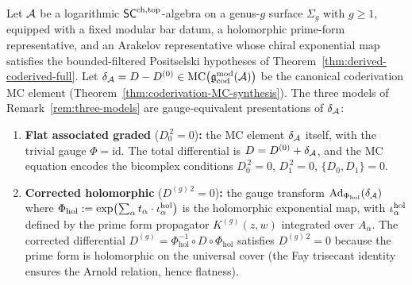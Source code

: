 \begin{theorem}
\label{thm:three-models-gauge-orbit}
Let $\mathcal{A}$ be a logarithmic $\mathsf{SC}^{\mathrm{ch,top}}$-algebra on a genus-$g$ surface
$\Sigma_g$ with $g \ge 1$, equipped with a fixed modular bar datum, a
holomorphic prime-form representative, and an Arakelov representative
whose chiral exponential map satisfies the bounded-filtered Positselski
hypotheses of Theorem~\ref{thm:derived-coderived-full}. Let
$\delta_{\mathcal{A}} = D - D^{(0)} \in
\operatorname{MC}\bigl(\mathfrak{g}^{\mathrm{mod}}_{\mathrm{cod}}(\mathcal{A})\bigr)$
be the canonical coderivation MC element
\textup{(}Theorem~\textup{\ref{thm:coderivation-MC-synthesis})}.
The three models of
Remark~\textup{\ref{rem:three-models}} are gauge-equivalent
presentations of $\delta_{\mathcal{A}}$:
\begin{enumerate}[label=\textup{(\roman*)}]
\item \textbf{Flat associated graded}
 \textup{(}$D_0^{\,2} = 0$\textup{)}\textbf{:}
 the MC element $\delta_{\mathcal{A}}$ itself, with the trivial gauge
 $\Phi = \mathrm{id}$. The total differential is
 $D = D^{(0)} + \delta_{\mathcal{A}}$, and the MC equation encodes
 the bicomplex conditions $D_0^{\,2} = 0$, $D_1^{\,2} = 0$,
 $\{D_0, D_1\} = 0$.

\item \textbf{Corrected holomorphic}
 \textup{(}$D^{(g)\,2} = 0$\textup{)}\textbf{:}
 the gauge transform $\operatorname{Ad}_{\Phi_{\mathrm{hol}}}(\delta_{\mathcal{A}})$
 where
 $\Phi_{\mathrm{hol}} :=
 \exp\bigl(\sum_\alpha t_\alpha \cdot \iota_\alpha^{\mathrm{hol}}\bigr)$
 is the holomorphic exponential map, with $\iota_\alpha^{\mathrm{hol}}$
 defined by the prime form propagator $K^{(g)}(z,w)$ integrated
 over $A_\alpha$. The corrected differential
 $D^{(g)} = \Phi_{\mathrm{hol}}^{-1} \circ D \circ \Phi_{\mathrm{hol}}$
 satisfies $D^{(g)\,2} = 0$ because the prime form is holomorphic
 on the universal cover \textup{(}the Fay trisecant identity
 ensures the Arnold relation, hence flatness\textup{)}.


\end{enumerate}
\end{theorem}
